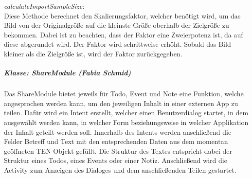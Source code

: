 \textit{calculateImportSampleSize}:\\
Diese Methode berechnet den Skalierungsfaktor, welcher benötigt wird, um das Bild von der Originalgröße auf die kleinste Größe oberhalb der Zielgröße zu bekommen. Dabei ist zu beachten, dass der Faktor eine Zweierpotenz ist, da auf diese abgerundet wird. Der Faktor wird schrittweise erhöht. Sobald das Bild kleiner als die Zielgröße ist, wird der Faktor zurückgegeben.

\subparagraph*{Klasse: ShareModule (Fabia Schmid)}
Das ShareModule bietet jeweils für Todo, Event und Note eine Funktion, welche angesprochen werden kann, um den jeweiligen Inhalt in einer externen App zu teilen. Dafür wird ein Intent erstellt, welcher einen Benutzerdialog startet, in dem ausgewählt werden kann, in welcher Form beziehungsweise in welcher Applikation der Inhalt geteilt werden soll. Innerhalb des Intents werden anschließend die Felder Betreff und Text mit den entsprechenden Daten aus dem momentan geöffneten TEN-Objekt gefüllt. Die Struktur des Textes entspricht dabei der Struktur eines Todos, eines Events oder einer Notiz. Anschließend wird die Activity zum Anzeigen des Dialoges und dem anschließenden Teilen gestartet.




